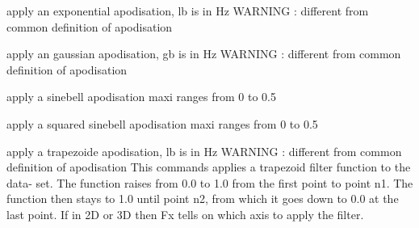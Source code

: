 \documentclass[letterpaper,10pt,openany,oneside]{sphinxmanual}
\begin{document}
\begin{fulllineitems}

\begin{fulllineitems}
\label{rst/code:NPKData.NPKData.apod_em}
apply an exponential apodisation, lb is in Hz
WARNING : different from common definition of apodisation

\end{fulllineitems}


\begin{fulllineitems}
\label{rst/code:NPKData.NPKData.apod_gm}
apply an gaussian apodisation, gb is in Hz
WARNING : different from common definition of apodisation

\end{fulllineitems}


\begin{fulllineitems}
\label{rst/code:NPKData.NPKData.apod_sin}
apply a sinebell apodisation
maxi ranges from 0 to 0.5

\end{fulllineitems}


\begin{fulllineitems}
\label{rst/code:NPKData.NPKData.apod_sq_sin}
apply a squared sinebell apodisation
maxi ranges from 0 to 0.5

\end{fulllineitems}


\begin{fulllineitems}
\label{rst/code:NPKData.NPKData.apod_tm}
apply a trapezoide apodisation, lb is in Hz
WARNING : different from common definition of apodisation
This commands applies a trapezoid filter function to the data-
set. The function raises from 0.0 to 1.0 from the first point to 
point n1. The function then stays to 1.0 until point n2, from which 
it goes down to 0.0 at the last point.
If in 2D or 3D then Fx tells on which axis to apply the filter.


\end{fulllineitems}
\end{fulllineitems}
\end{document}
